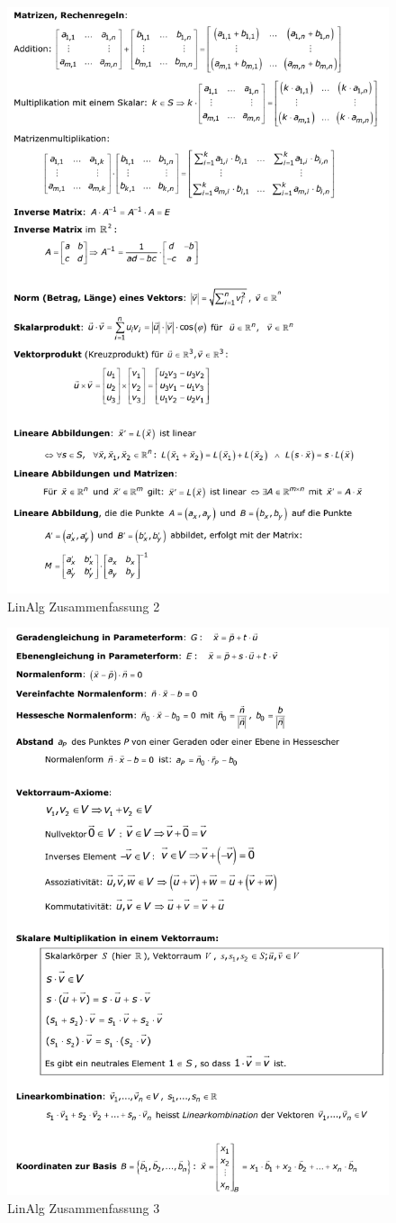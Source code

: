 \documentclass[../Main.tex]{subfiles}
\begin{document}
\begin{figure}[H]
    \centering
    \includegraphics[width=0.75\linewidth]{Images/dmi_2.png}
    \caption{LinAlg Zusammenfassung 2}
\end{figure}

\begin{figure}[H]
    \centering
    \includegraphics[width=0.75\linewidth]{Images/dmi_3.png}
    \caption{LinAlg Zusammenfassung 3}
\end{figure}
\end{document}
